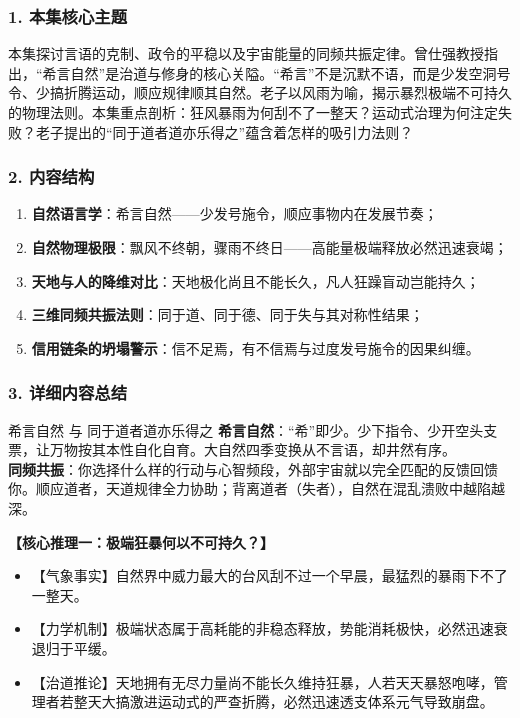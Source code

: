 \subsubsection{1. 本集核心主题}
本集探讨言语的克制、政令的平稳以及宇宙能量的同频共振定律。曾仕强教授指出，“希言自然”是治道与修身的核心关隘。“希言”不是沉默不语，而是少发空洞号令、少搞折腾运动，顺应规律顺其自然。老子以风雨为喻，揭示暴烈极端不可持久的物理法则。本集重点剖析：狂风暴雨为何刮不了一整天？运动式治理为何注定失败？老子提出的“同于道者道亦乐得之”蕴含着怎样的吸引力法则？

\subsubsection{2. 内容结构}
\begin{enumerate}
    \item \textbf{自然语言学}：希言自然——少发号施令，顺应事物内在发展节奏；
    \item \textbf{自然物理极限}：飘风不终朝，骤雨不终日——高能量极端释放必然迅速衰竭；
    \item \textbf{天地与人的降维对比}：天地极化尚且不能长久，凡人狂躁盲动岂能持久；
    \item \textbf{三维同频共振法则}：同于道、同于德、同于失与其对称性结果；
    \item \textbf{信用链条的坍塌警示}：信不足焉，有不信焉与过度发号施令的因果纠缠。
\end{enumerate}

\subsubsection{3. 详细内容总结}

\begin{ConceptBox}{希言自然 与 同于道者道亦乐得之}
\textbf{希言自然}：“希”即少。少下指令、少开空头支票，让万物按其本性自化自育。大自然四季变换从不言语，却井然有序。\\
\textbf{同频共振}：你选择什么样的行动与心智频段，外部宇宙就以完全匹配的反馈回馈你。顺应道者，天道规律全力协助；背离道者（失者），自然在混乱溃败中越陷越深。
\end{ConceptBox}

\noindent\textbf{【核心推理一：极端狂暴何以不可持久？】}
\begin{itemize}
    \item 【气象事实】自然界中威力最大的台风刮不过一个早晨，最猛烈的暴雨下不了一整天。
    \item 【力学机制】极端状态属于高耗能的非稳态释放，势能消耗极快，必然迅速衰退归于平缓。
    \item 【治道推论】天地拥有无尽力量尚不能长久维持狂暴，人若天天暴怒咆哮，管理者若整天大搞激进运动式的严查折腾，必然迅速透支体系元气导致崩盘。
\end{itemize}

